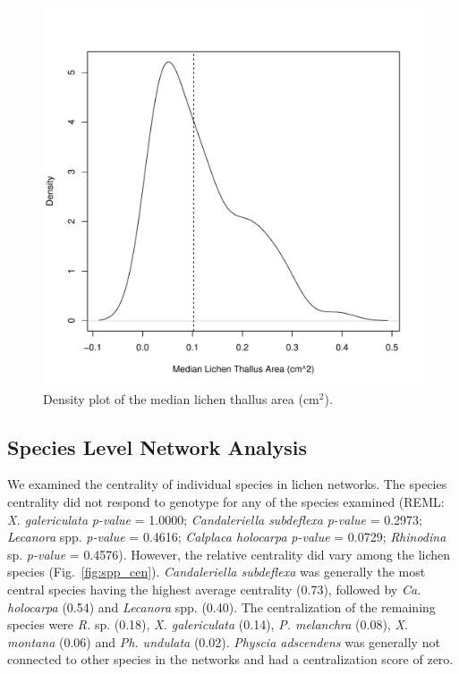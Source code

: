 \documentclass[11pt,onecolumn,lineno]{olplainarticle}
\begin{document}
\begin{figure}[ht]
\centering
\includegraphics[width=\linewidth]{figures/xg_size.pdf}
\caption{Density plot of the median lichen thallus area (cm$^2$). }
\label{fig:SI_xg_median}
\end{figure}




\subsection*{Species Level Network Analysis}


We examined the centrality of individual species in lichen
networks. The species centrality did not respond to genotype for any
of the species examined (REML: \textit{X. galericulata}
\textit{p-value} = 1.0000; \textit{Candaleriella subdeflexa}
\textit{p-value} = 0.2973; \textit{Lecanora} spp. \textit{p-value} =
0.4616; \textit{Calplaca holocarpa} \textit{p-value} = 0.0729;
\textit{Rhinodina} sp. \textit{p-value} = 0.4576). However, the
relative centrality did vary among the lichen species
(Fig.~\ref{fig:spp_cen}). \textit{Candaleriella subdeflexa} was
generally the most central species having the highest average
centrality (0.73), followed by \textit{Ca. holocarpa} (0.54) and
\textit{Lecanora} spp. (0.40). The centralization of the remaining
species were \textit{R.}  sp. (0.18), \textit{X. galericulata} (0.14),
\textit{P. melanchra} (0.08), \textit{X. montana} (0.06) and
\textit{Ph. undulata} (0.02). \textit{Physcia adscendens} was
generally not connected to other species in the networks and had a
centralization score of zero.
\end{document}
